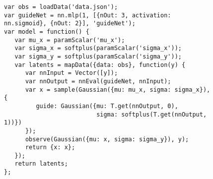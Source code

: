 \begin{figure}

\begin{minipage}{\linewidth}
\begin{minipage}{0.66\linewidth}
\begin{lstlisting}[style=smaller]
var obs = loadData('data.json');
var guideNet = nn.mlp(1, [{nOut: 3, activation: nn.sigmoid}, {nOut: 2}], 'guideNet');
var model = function() {
   var mu_x = paramScalar('mu_x');
   var sigma_x = softplus(paramScalar('sigma_x'));
   var sigma_y = softplus(paramScalar('sigma_y'));
   var latents = mapData({data: obs}, function(y) {
      var nnInput = Vector([y]);
      var nnOutput = nnEval(guideNet, nnInput);
      var x = sample(Gaussian({mu: mu_x, sigma: sigma_x}), {
         guide: Gaussian({mu: T.get(nnOutput, 0),
                          sigma: softplus(T.get(nnOutput, 1))})
      });
      observe(Gaussian({mu: x, sigma: sigma_y}), y);
      return {x: x};
   });
   return latents;
};
\end{lstlisting}
\end{minipage}
%
\begin{minipage}{0.33\linewidth}
\begin{flushright}
\end{flushright}
\end{minipage}
\end{minipage}


\end{figure}
